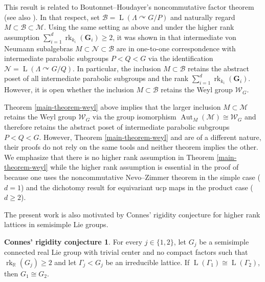 \documentclass[11pt]{amsart}
\numberwithin{equation}{section}
\theoremstyle{plain}
\theoremstyle{definition}
\newtheorem*{CRC}{Connes'\! rigidity conjecture}
\newcommand{\R}{\mathbb{R}}
\newcommand{\Aut}{\operatorname{Aut}}
\newcommand{\rk}{\operatorname{rk}}
\newcommand{\rL}{\operatorname{ L}}
\begin{document}
This result is related to Boutonnet--Houdayer's noncommutative factor theorem \cite{BH22} (see also \cite{Ho21}). In that respect, set $\mathscr B = \rL(\Lambda \curvearrowright G/P)$ and naturally regard $M \subset \mathscr B \subset \mathscr M$. Using the same setting as above and under the higher rank assumption $\sum_{i = 1}^d \rk_{k_i}(\mathbf G_i) \geq 2$, it was shown in \cite[Theorem B]{BH22} that intermediate von Neumann subalgebras $M \subset \mathscr N \subset \mathscr B$ are in one-to-one correspondence with intermediate parabolic subgroups $P < Q < G$ via the identification $\mathscr N = \rL(\Lambda \curvearrowright G/Q)$. In particular, the inclusion $M \subset \mathscr B$ retains the abstract poset of all intermediate parabolic subgroups and the rank $\sum_{i = 1}^d \rk_{k_i}(\mathbf G_i)$. However, it is open whether the inclusion $M \subset \mathscr B$ retains the Weyl group $\mathscr W_G$.


Theorem \ref{main-theorem-weyl} above implies that the larger inclusion $M \subset \mathscr M$ retains the Weyl group $\mathscr W_G$ via the group isomorphism $\Aut_M(\mathscr M) \cong \mathscr W_G$ and therefore retains the abstract poset of intermediate parabolic subgroups $P < Q < G$. However, Theorem \ref{main-theorem-weyl} and \cite[Theorem B]{BH22} are of a different nature, their proofs do not rely on the same tools and neither theorem implies the other. We emphasize that there is no higher rank assumption in Theorem \ref{main-theorem-weyl} while the higher rank assumption is essential in the proof of \cite[Theorem B]{BH22} because one uses the noncommutative Nevo--Zimmer theorem \cite{BH19, BBH21} in the simple case ($d = 1$) and the dichotomy result for equivariant ucp maps \cite{BBHP20} in the product case ($d \geq 2$).


The present work is also motivated by Connes'\! rigidity conjecture for higher rank lattices in semisimple Lie groups.


\begin{CRC}
For every $j \in \{1, 2\}$, let $G_j$ be a semisimple connected real Lie group with trivial center and no compact factors such that $\rk_{\R}(G_j) \geq 2$ and let $\Gamma_j < G_j$ be an irreducible lattice. If $\rL(\Gamma_1) \cong \rL(\Gamma_2)$, then $G_1 \cong G_2$.
\end{CRC}
\end{document}
